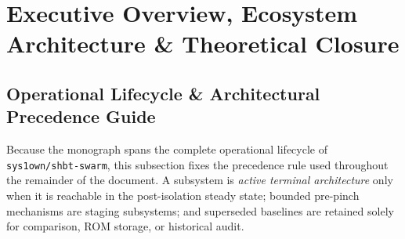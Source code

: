 \documentclass[11pt,onecolumn]{article}
\begin{document}
\newpage
\tableofcontents

\FloatBarrier
\section{Executive Overview, Ecosystem Architecture \& Theoretical Closure}

\subsection{Operational Lifecycle \& Architectural Precedence Guide}
\label{subsec:operational_lifecycle_precedence}

Because the monograph spans the complete operational lifecycle of \texttt{sys1own/shbt-swarm}, this subsection fixes the precedence rule used throughout the remainder of the document. A subsystem is \emph{active terminal architecture} only when it is reachable in the post-isolation steady state; bounded pre-pinch mechanisms are staging subsystems; and superseded baselines are retained solely for comparison, ROM storage, or historical audit.
\end{document}
